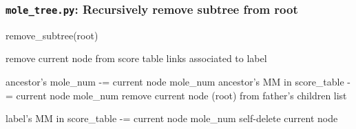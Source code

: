 \documentclass{beamer}
\begin{document}

\begin{frame}[fragile]
\frametitle{\texttt{mole\_tree.py}: Recursively remove subtree from root}
\begin{algorithm}[H]
\caption{remove\_subtree(root)}\label{alg:cap}
\begin{algorithmic}
    \State remove current node from score table links associated to label
\end{algorithmic}
\begin{algorithmic}
      
\end{algorithmic}
\begin{algorithmic}
  
        \State ancestor's mole\_num -= current node mole\_num
        \State ancestor's MM in score\_table -= current node mole\_num
    \EndFor
    \State remove current node (root) from father's children list
\end{algorithmic}
\begin{algorithmic}
\State label's MM in score\_table -= current node mole\_num
\State self-delete current node\\ 
\end{algorithmic}
\end{algorithm}
\end{frame}
\end{document}
